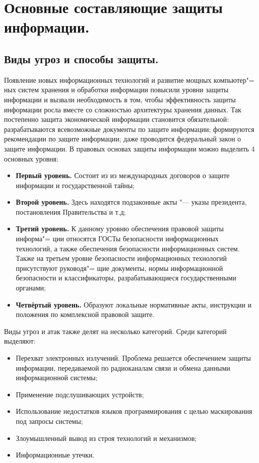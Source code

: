 \section{Основные составляющие защиты информации.}
\subsection{Виды угроз и способы защиты.}
Появление новых информационных технологий и развитие мощных компьютер"=
ных систем хранения и обработки информации повысили уровни защиты информации и вызвали 
необходимость в том, чтобы эффективность защиты информации росла вместе со сложностью архитектуры хранения данных. Так постепенно защита экономической информации 
становится обязательной: разрабатываются всевозможные документы по защите информации; формируются рекомендации по защите информации; даже проводится федеральный закон 
о защите информации. В правовых основах защиты информации можно выделить 4 основных уровня:
\begin{itemize}
    \item \textbf{Первый уровень.} Состоит из из международных договоров о защите информации и государственной тайны;
    \item \textbf{Второй уровень.} Здесь находятся подзаконные акты "--- указы президента, постановления Правительства и т.д;
    \item \textbf{Третий уровень.} К данному уровню обеспечения правовой защиты информа"=
    ции относятся ГОСТы безопасности информационных технологий, а также обеспечения безопасности информационных систем.
    Также на третьем уровне безопасности информационных технологий присутствуют руководя"=
    щие документы, нормы информационной безопасности и классификаторы, разрабатывающиеся 
    государственными органами;
    \item \textbf{Четвёртый уровень.} Образуют локальные нормативные акты, инструкции и положения по комплексной правовой защите.\cite{def_inf}
\end{itemize}
Виды угроз и атак также делят на несколько категорий. Среди категорий выделяют:
\begin{itemize}
    \item Перехват электронных излучений. Проблема решается обеспечением защиты информации, передаваемой по радиоканалам связи и обмена данными 
    информационной системы;
    \item Применение подслушивающих устройств;
    \item Использование недостатков языков программирования с целью маскирования под запросы системы;
    \item Злоумышленный вывод из строя технологий и механизмов;
    \item Информационные утечки.
\end{itemize}

